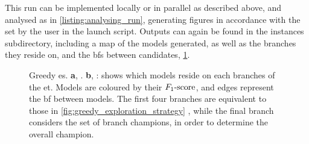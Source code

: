 This \gls{run} can be implemented locally or in parallel as described above\footnotemark,
    and analysed as in \cref{listing:analysing_run},
    generating figures in accordance with the  set by the user in the launch script. 
Outputs can again be found in the \glspl{instance} subdirectory, including a map of the models generated, 
    as well as the branches they reside on, and the \glspl{bf} between candidates, \cref{fig:example_es_greedy}. 

\begin{figure}[H]
    \begin{center}
    \qquad
    \end{center}
    \caption[Greedy exploration strategy]{
        Greedy \acrlong{es}. 
        \textbf{a}, . 
        \textbf{b}, : shows which models reside on each branches of the \acrlong{et}. 
        Models are coloured by their $ F_{1}\text{-score} $, and edges represent the \gls{bf} between models. 
        The first four branches are equivalent to those in \cref{fig:greedy_exploration_strategy} ,
        while the final branch considers the set of branch champions, in order to determine the overall champion. 
    }
    \label{fig:example_es_greedy}
\end{figure}


